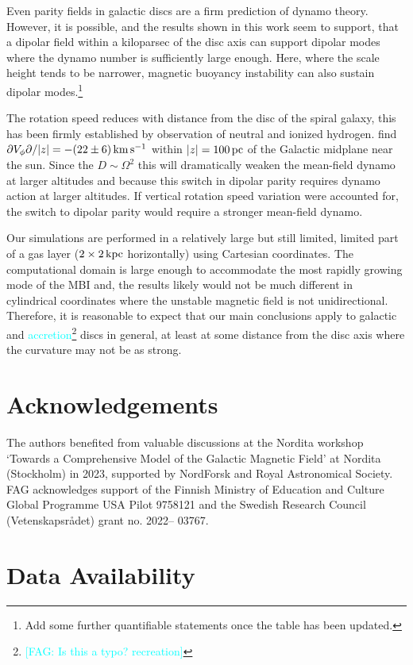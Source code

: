 \documentclass[fleqn,usenatbib]{mnras}
\newcommand{\fg}[1]{\textcolor{cyan}{#1}} %
\newcommand{\fag}[1]{\textcolor{cyan}{[FAG: #1]}} %
\newcommand{\km}{\,{\rm km}}    %
\newcommand{\p}{\,{\rm pc}}     %
\newcommand{\kpc}{\,{\rm kpc}}  %
\newcommand{\s}{\,{\rm s}}      %
\newcommand{\kms}{\km\s^{-1}}    %
\begin{document}
{Even parity fields in galactic discs are a firm prediction of dynamo
theory{.  However,} it is possible, and the results shown in this work seem
to support, that a dipolar field within a kiloparsec of the disc axis {can
support dipolar modes where} the dynamo number is sufficiently large enough.
{Here, where the scale height tends to be narrower, magnetic buoyancy
instability can also sustain dipolar modes.\footnote{Add some further
quantifiable statements once the table has been updated.}}

The rotation speed reduces with distance from the disc of the spiral galaxy,
this has been firmly established by observation of neutral and ionized
hydrogen. \citet{LHB2008} find $\partial V_{\phi}\partial/\lvert z\rvert =
-(22\pm 6)\kms$ within $\lvert z\rvert = 100\p$ of the Galactic midplane near
the sun. Since the $D\sim \Omega^2$ this will dramatically weaken the
mean-field dynamo at larger altitudes and because this switch in dipolar parity
requires dynamo action at larger altitudes. If vertical rotation speed
variation were accounted for, the switch to dipolar parity would require a
stronger mean-field dynamo.


Our simulations are performed in a relatively large but still limited, limited
part of a gas layer ($2 \times 2\kpc$ horizontally) using Cartesian
coordinates. The computational domain is large enough to accommodate the most
rapidly growing mode of the MBI and, the results likely would not be much
different in cylindrical coordinates where the unstable magnetic field is not
unidirectional. Therefore, it is reasonable to expect that our main conclusions
apply to galactic and \fg{accretion}\footnote{\fag{Is this a typo? recreation}}
discs {in general,} at least at some distance from the disc axis where the
curvature may not be as strong.

\section*{Acknowledgements}
The authors benefited from valuable discussions at the Nordita workshop
`Towards a Comprehensive Model of the Galactic Magnetic Field' at Nordita
(Stockholm) in 2023, supported by NordForsk and Royal Astronomical Society.
FAG acknowledges support of the Finnish Ministry of Education and Culture
Global Programme USA Pilot 9758121 and the Swedish Research Council
(Vetenskapsrådet) grant no. 2022– 03767.

\section*{Data Availability}

}
\end{document}
